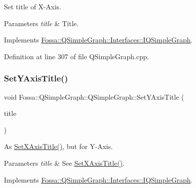 Set title of X-\/\+Axis. 


\begin{DoxyParams}{Parameters}
{\em title} & Title. \\
\hline
\end{DoxyParams}


Implements \hyperlink{class_fossa_1_1_q_simple_graph_1_1_interfaces_1_1_i_q_simple_graph_adfca7d41a47790e8403507544468ba86}{Fossa\+::\+Q\+Simple\+Graph\+::\+Interfaces\+::\+I\+Q\+Simple\+Graph}.



Definition at line 307 of file Q\+Simple\+Graph.\+cpp.

\mbox{\label{class_fossa_1_1_q_simple_graph_1_1_q_simple_graph_a41c9e9d34744f6e6550ca97dc0d2f488}} 
\subsubsection{\texorpdfstring{Set\+Y\+Axis\+Title()}{SetYAxisTitle()}}
{\footnotesize\ttfamily void Fossa\+::\+Q\+Simple\+Graph\+::\+Q\+Simple\+Graph\+::\+Set\+Y\+Axis\+Title (\begin{DoxyParamCaption}\item[{Q\+String}]{title }\end{DoxyParamCaption})\hspace{0.3cm}{\ttfamily [virtual]}}



As \hyperlink{class_fossa_1_1_q_simple_graph_1_1_q_simple_graph_a7579da572b54d43ccec3d2bd572b6cfa}{Set\+X\+Axis\+Title()}, but for Y-\/\+Axis. 


\begin{DoxyParams}{Parameters}
{\em title} & See \hyperlink{class_fossa_1_1_q_simple_graph_1_1_q_simple_graph_a7579da572b54d43ccec3d2bd572b6cfa}{Set\+X\+Axis\+Title()}. \\
\hline
\end{DoxyParams}


Implements \hyperlink{class_fossa_1_1_q_simple_graph_1_1_interfaces_1_1_i_q_simple_graph_a606c07c40ed294cdd568de5488875af5}{Fossa\+::\+Q\+Simple\+Graph\+::\+Interfaces\+::\+I\+Q\+Simple\+Graph}.



